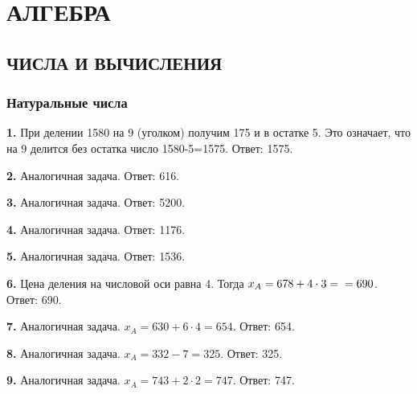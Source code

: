 \chapter{АЛГЕБРА}
\section{ЧИСЛА И ВЫЧИСЛЕНИЯ}
\subsection{Натуральные числа}


\textbf{1.} При делении 1580 на 9 (уголком) получим 175 и в остатке 5. Это означает, что на 9 делится без остатка число 1580-5=1575.   
\newline \null \hspace*{\fill} Ответ: 1575.

\textbf{2.} Аналогичная задача. \newline \null \hspace*{\fill} Ответ: 616.

\textbf{3.} Аналогичная задача. \newline \null \hspace*{\fill} Ответ: 5200.

\textbf{4.} Аналогичная задача. \newline \null \hspace*{\fill} Ответ: 1176.

\textbf{5.} Аналогичная задача. \newline \null \hspace*{\fill} Ответ: 1536.

\textbf{6.} Цена деления на числовой оси равна 4. Тогда $x_A=678+4\cdot3=\newline=690$. \newline \null \hspace*{\fill} Ответ: 690. 

\textbf{7.} Аналогичная задача. $x_A=630+6\cdot4=654$. \newline \null \hspace*{\fill} Ответ: 654. 

\textbf{8.} Аналогичная задача. $x_A=332-7=325$. \newline \null \hspace*{\fill} Ответ: 325. 

\textbf{9.} Аналогичная задача. $x_A=743+2\cdot2=747$. \newline \null \hspace*{\fill} Ответ: 747. 

